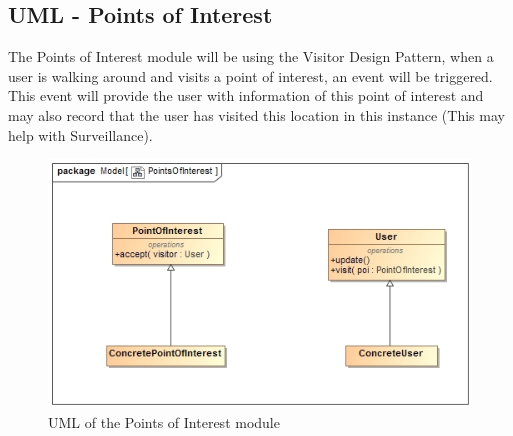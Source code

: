 \documentclass[12pt,a4paper]{article}
\begin{document}
	\subsection{UML - Points of Interest}
	The Points of Interest module will be using the Visitor Design Pattern, when a user is walking around and visits a point of interest, an event will be triggered. This event will provide the user with information of this point of interest and may also record that the user has visited this location in this instance (This may help with Surveillance).
	\begin{figure}
		\includegraphics[width=\linewidth]{Images/PointsOfInterest.jpg}
		\caption{UML of the Points of Interest module}
	\end{figure}
\end{document}
